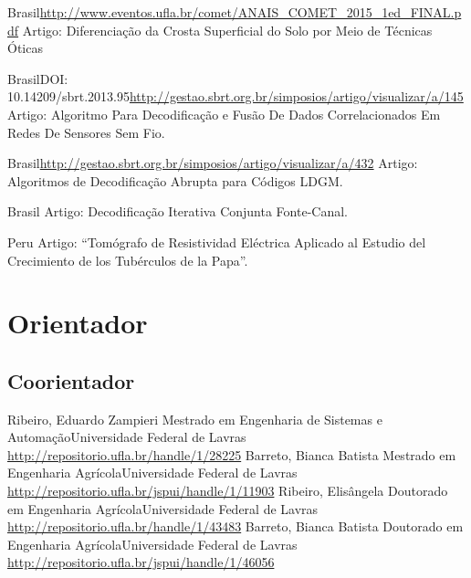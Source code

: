 \documentclass[11pt,a4paper,sans]{moderncv} %
\begin{document}
	      {Brasil}{}{\url{http://www.eventos.ufla.br/comet/ANAIS\_COMET\_2015\_1ed\_FINAL.pdf}}
	      {Artigo: Diferenciação da Crosta Superficial do Solo por Meio de Técnicas Óticas}


	      {Brasil}{DOI: 10.14209/sbrt.2013.95}{\url{http://gestao.sbrt.org.br/simposios/artigo/visualizar/a/145}}
	      {Artigo: Algoritmo Para Decodificação e Fusão De Dados Correlacionados Em Redes De Sensores Sem Fio.}

	      {Brasil}{}{\url{http://gestao.sbrt.org.br/simposios/artigo/visualizar/a/432}}
	      {Artigo: Algoritmos de Decodificação Abrupta para Códigos LDGM.}

	      {Brasil}{}{}%
	      {Artigo: Decodificação Iterativa Conjunta Fonte-Canal.}

	      {Peru}{}{}
	      {Artigo: ``Tomógrafo de Resistividad Eléctrica Aplicado al Estudio del Crecimiento de los Tubérculos de la Papa''.}


	       
\section{Orientador}
\subsection{Coorientador}
			{Ribeiro, Eduardo Zampieri}
			{Mestrado em Engenharia de Sistemas e Automação}{Universidade Federal de Lavras}
			{\url{http://repositorio.ufla.br/handle/1/28225}}
			{Barreto, Bianca Batista}
			{Mestrado em Engenharia Agrícola}{Universidade Federal de Lavras}
			{\url{http://repositorio.ufla.br/jspui/handle/1/11903}}
			{Ribeiro, Elisângela }
			{Doutorado em Engenharia Agrícola}{Universidade Federal de Lavras}
			{\url{http://repositorio.ufla.br/handle/1/43483}}
			{Barreto, Bianca Batista}
			{Doutorado em Engenharia Agrícola}{Universidade Federal de Lavras}
			{\url{http://repositorio.ufla.br/jspui/handle/1/46056}}
			
\end{document}
